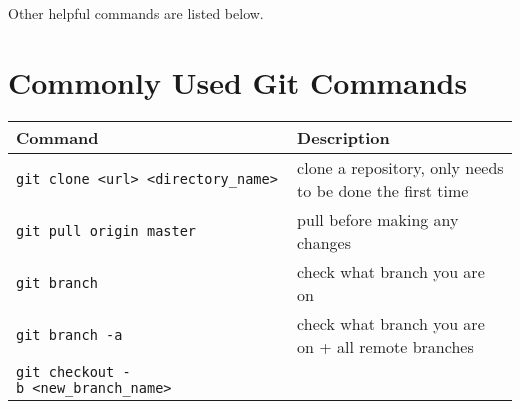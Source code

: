\documentclass[
]{book}
\begin{document}
Other helpful commands are listed below.

\hypertarget{commonly-used-git-commands}{%
\section{Commonly Used Git Commands}\label{commonly-used-git-commands}}

\begin{longtable}[]{@{}ll@{}}
\toprule
\begin{minipage}[b]{0.34\columnwidth}\raggedright
Command\strut
\end{minipage} & \begin{minipage}[b]{0.60\columnwidth}\raggedright
Description\strut
\end{minipage}\tabularnewline
\midrule
\endhead
\begin{minipage}[t]{0.34\columnwidth}\raggedright
\texttt{git\ clone\ \textless{}url\textgreater{}\ \textless{}directory\_name\textgreater{}}\strut
\end{minipage} & \begin{minipage}[t]{0.60\columnwidth}\raggedright
clone a repository, only needs to be done the first time\strut
\end{minipage}\tabularnewline
\begin{minipage}[t]{0.34\columnwidth}\raggedright
\texttt{git\ pull\ origin\ master}\strut
\end{minipage} & \begin{minipage}[t]{0.60\columnwidth}\raggedright
pull before making any changes\strut
\end{minipage}\tabularnewline
\begin{minipage}[t]{0.34\columnwidth}\raggedright
\texttt{git\ branch}\strut
\end{minipage} & \begin{minipage}[t]{0.60\columnwidth}\raggedright
check what branch you are on\strut
\end{minipage}\tabularnewline
\begin{minipage}[t]{0.34\columnwidth}\raggedright
\texttt{git\ branch\ -a}\strut
\end{minipage} & \begin{minipage}[t]{0.60\columnwidth}\raggedright
check what branch you are on + all remote branches\strut
\end{minipage}\tabularnewline
\begin{minipage}[t]{0.34\columnwidth}\raggedright
\texttt{git\ checkout\ -b\ \textless{}new\_branch\_name\textgreater{}}\strut

\end{minipage}
\end{longtable}
\end{document}
